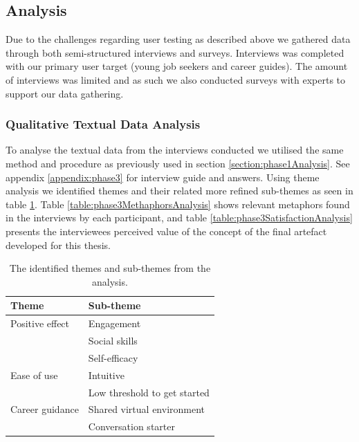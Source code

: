 






\subsection{Analysis}
Due to the challenges regarding user testing as described above we gathered data through both semi-structured interviews and surveys. Interviews was completed with our primary user target (young job seekers and career guides). The amount of interviews was limited and as such we also conducted surveys with experts to support our data gathering.      


\subsubsection{Qualitative Textual Data Analysis}
To analyse the textual data from the interviews conducted we utilised the same method and procedure as previously used in section \ref{section:phase1Analysis}. See appendix \ref{appendix:phase3} for interview guide and answers. Using theme analysis we identified themes and their related more refined sub-themes as seen in table \ref{table:phase3ThemeAnalysis}. Table \ref{table:phase3MethaphorsAnalysis} shows relevant metaphors found in the interviews by each participant, and table \ref{table:phase3SatisfactionAnalysis} presents the interviewees perceived value of the concept of the final artefact developed for this thesis.


\begin{table}[H]
      \centering
        \begin{tabular}{ll}
        \toprule
        Theme & Sub-theme \\
        \midrule
       Positive effect & Engagement\\
        & Social skills \\\vspace{0.2cm}
        & Self-efficacy \\
        Ease of use & Intuitive\\\vspace{0.2cm}
        & Low threshold to get started \\
        Career guidance & Shared virtual environment\\\vspace{0.2cm}
        & Conversation starter \\
        \bottomrule
        \end{tabular}
        \caption{The identified themes and sub-themes from the analysis.}
        \label{table:phase3ThemeAnalysis}
\end{table}






